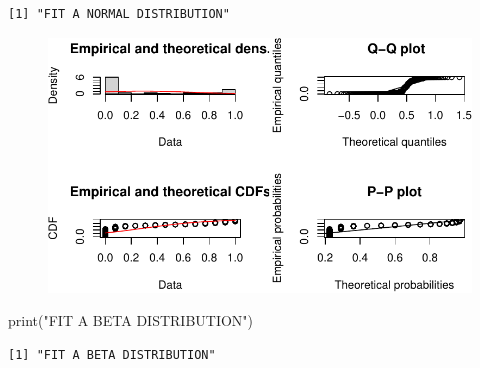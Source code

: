 \documentclass[
  letterpaper,
  DIV=11,
  numbers=noendperiod]{scrreprt}
\newenvironment{Shaded}{\begin{snugshade}}{\end{snugshade}}
\newcommand{\AttributeTok}[1]{\textcolor[rgb]{0.40,0.45,0.13}{#1}}
\newcommand{\FunctionTok}[1]{\textcolor[rgb]{0.28,0.35,0.67}{#1}}
\newcommand{\NormalTok}[1]{\textcolor[rgb]{0.00,0.23,0.31}{#1}}
\newcommand{\OtherTok}[1]{\textcolor[rgb]{0.00,0.23,0.31}{#1}}
\newcommand{\SpecialCharTok}[1]{\textcolor[rgb]{0.37,0.37,0.37}{#1}}
\newcommand{\StringTok}[1]{\textcolor[rgb]{0.13,0.47,0.30}{#1}}
\begin{document}
\begin{verbatim}
[1] "FIT A NORMAL DISTRIBUTION"
\end{verbatim}

\begin{Shaded}
\end{Shaded}

\begin{figure}[H]

{\centering \includegraphics{analysis/SGC3A/3_sgc3A_description_files/figure-pdf/FIT-DIST-TOTAL-ABS-2.pdf}

}

\end{figure}

\begin{Shaded}
\begin{Highlighting}[]
\FunctionTok{print}\NormalTok{(}\StringTok{"FIT A BETA DISTRIBUTION"}\NormalTok{)}
\end{Highlighting}
\end{Shaded}

\begin{verbatim}
[1] "FIT A BETA DISTRIBUTION"
\end{verbatim}

\begin{Shaded}
\end{Shaded}
\end{document}
